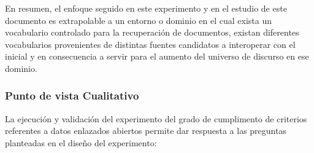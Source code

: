 En resumen, el enfoque seguido en este experimento y en el estudio de este documento es extrapolable a un entorno o dominio en el cual exista un vocabulario 
controlado para la recuperación de documentos, existan diferentes vocabularios provenientes de distintas fuentes 
candidatos a interoperar con el inicial y en consecuencia a servir para el aumento del universo de discurso en 
ese dominio.


\subsubsection{Punto de vista Cualitativo}
La ejecución y validación del experimento del grado de cumplimento de criterios referentes a datos enlazados abiertos permite 
dar respuesta a las preguntas planteadas en el diseño del experimento:

